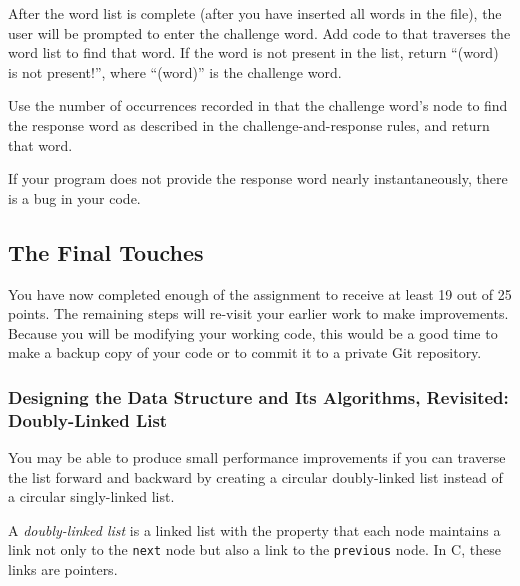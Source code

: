 

After the word list is complete (after you have inserted all words in the file), the user will be prompted to enter the challenge word.
Add code to  that traverses the word list to find that word.
If the word is not present in the list, return ``(word) is not present!'', where ``(word)'' is the challenge word.

Use the number of occurrences recorded in that the challenge word's node to find the response word as described in the challenge-and-response rules, and return that word.
%
%

If your program does not provide the response word nearly instantaneously, there is a bug in your code.

\subsection{The Final Touches}

You have now completed enough of the assignment to receive at least 19 out of 25 points.
The remaining steps will re-visit your earlier work to make improvements.
Because you will be modifying your working code, this would be a good time to make a backup copy of your code or to commit it to a private Git repository.

\subsubsection{Designing the Data Structure and Its Algorithms, Revisited: Doubly-Linked List} \label{subsubsec:doublylinkedlist}

You may be able to produce small performance improvements if you can traverse the list forward and backward by creating a circular doubly-linked list instead of a circular singly-linked list.

A \textit{doubly-linked list} is a linked list with the property that each node maintains a link not only to the \lstinline{next} node but also a link to the \lstinline{previous} node.
In C, these links are pointers.

